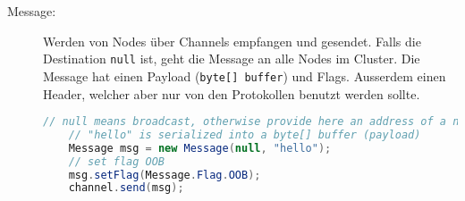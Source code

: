 \begin{description}
	\item[Message:] Werden von Nodes über Channels empfangen und gesendet. Falls die Destination \verb|null| ist, geht die Message an alle Nodes im Cluster. Die Message hat einen Payload (\verb|byte[] buffer|) und Flags. Ausserdem einen Header, welcher aber nur von den Protokollen benutzt werden sollte.
	
	\begin{lstlisting}[language=Java]
	// null means broadcast, otherwise provide here an address of a node
	// "hello" is serialized into a byte[] buffer (payload)	
	Message msg = new Message(null, "hello");
	// set flag OOB
	msg.setFlag(Message.Flag.OOB);
	channel.send(msg);
	\end{lstlisting}
		
\end{description}

